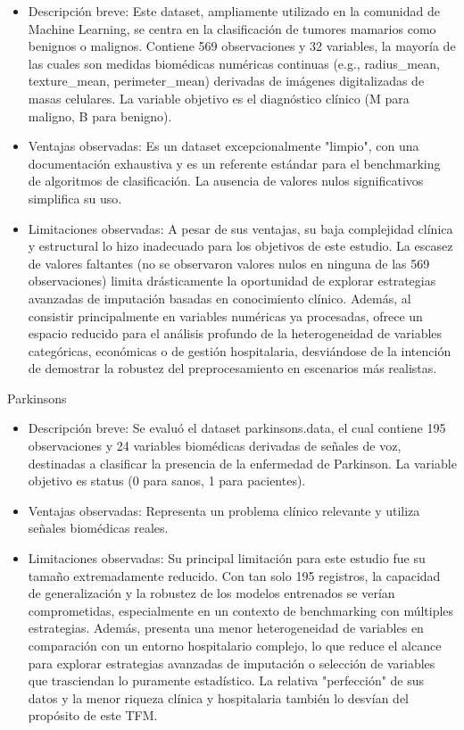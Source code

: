 \begin{itemize}
  \item Descripción breve: Este dataset, ampliamente utilizado en la comunidad de
    Machine Learning, se centra en la clasificación de tumores mamarios como
    benignos o malignos. Contiene 569 observaciones y 32 variables, la mayoría
    de las cuales son medidas biomédicas numéricas continuas (e.g., radius\_mean,
    texture\_mean, perimeter\_mean) derivadas de imágenes digitalizadas de masas
    celulares. La variable objetivo es el diagnóstico clínico (M para maligno, B
    para benigno).
  \item Ventajas observadas: Es un dataset excepcionalmente "limpio", con una
    documentación exhaustiva y es un referente estándar para el benchmarking de
    algoritmos de clasificación. La ausencia de valores nulos significativos
    simplifica su uso.
  \item Limitaciones observadas: A pesar de sus ventajas, su baja complejidad
    clínica y estructural lo hizo inadecuado para los objetivos de este
    estudio. La escasez de valores faltantes (no se observaron valores nulos en
    ninguna de las 569 observaciones) limita drásticamente la oportunidad de
    explorar estrategias avanzadas de imputación basadas en conocimiento
    clínico. Además, al consistir principalmente en variables numéricas ya
    procesadas, ofrece un espacio reducido para el análisis profundo de la
    heterogeneidad de variables categóricas, económicas o de gestión
    hospitalaria, desviándose de la intención de demostrar la robustez del
    preprocesamiento en escenarios más realistas.
\end{itemize}

Parkinsons~\citep{little2007}

\begin{itemize}
  \item Descripción breve: Se evaluó el dataset parkinsons.data, el cual contiene
    195 observaciones y 24 variables biomédicas derivadas de señales de voz,
    destinadas a clasificar la presencia de la enfermedad de Parkinson. La
    variable objetivo es status (0 para sanos, 1 para pacientes).
  \item Ventajas observadas: Representa un problema clínico relevante y utiliza
    señales biomédicas reales.
  \item Limitaciones observadas: Su principal limitación para este estudio fue su
    tamaño extremadamente reducido. Con tan solo 195 registros, la capacidad de
    generalización y la robustez de los modelos entrenados se verían
    comprometidas, especialmente en un contexto de benchmarking con múltiples
    estrategias. Además, presenta una menor heterogeneidad de variables en
    comparación con un entorno hospitalario complejo, lo que reduce el alcance
    para explorar estrategias avanzadas de imputación o selección de variables
    que trasciendan lo puramente estadístico. La relativa "perfección" de sus
    datos y la menor riqueza clínica y hospitalaria también lo desvían del
    propósito de este TFM.
\end{itemize}

